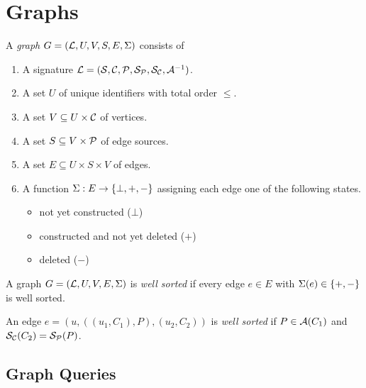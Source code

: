 \section{Graphs}
\label{sec:graphs}

\begin{definition}
  A \emph{graph} $G = (\mathcal{L}, U, V, S, E, \Sigma)$ consists of
  \begin{enumerate}
    \item A signature $\mathcal{L} = (\mathcal{S}, \mathcal{C}, \mathcal{P}, \mathcal{S}_{\mathcal{P}}, \mathcal{S}_{\mathcal{C}}, \mathcal{A}^{-1})$.
    \item A set $U$ of unique identifiers with total order $\leq$.
    \item A set $V \subseteq U \times \mathcal{C}$ of vertices.
    \item A set $S \subseteq V \times \mathcal{P}$ of edge sources.
    \item A set $E \subseteq U \times S \times V$ of edges.
    \item A function $\Sigma : E \to \left\{\bot,+,-\right\}$ assigning each edge one of the following states.
          \begin{itemize}
            \item not yet constructed ($\bot$)
            \item constructed and not yet deleted ($+$)
            \item deleted ($-$)
          \end{itemize}
  \end{enumerate}
\end{definition}

\begin{definition}
  A graph $G = (\mathcal{L}, U, V, E, \Sigma)$ is \emph{well sorted}
  if every edge $e \in E$ with $\Sigma(e) \in \left\{+,-\right\}$ is well sorted.
\end{definition}

\begin{definition}
  An edge $e = (u, ((u_1, C_1), P), (u_2, C_2))$ is \emph{well sorted}
  if $P \in \mathcal{A}(C_1)$ and $\mathcal{S}_{\mathcal{C}}(C_2) = \mathcal{S}_{\mathcal{P}}(P)$.
\end{definition}

\subsection{Graph Queries}
\label{sec:graph-queries}

